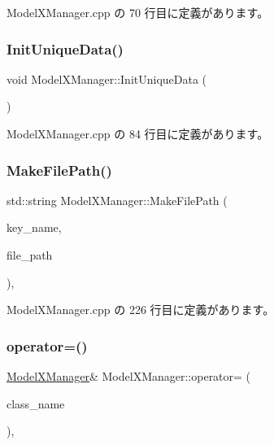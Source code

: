  Model\+X\+Manager.\+cpp の 70 行目に定義があります。

\mbox{\label{class_model_x_manager_a9bed6cb5ffcd2cbfec6c405e21af362e}} 
\subsubsection{\texorpdfstring{Init\+Unique\+Data()}{InitUniqueData()}}
{\footnotesize\ttfamily void Model\+X\+Manager\+::\+Init\+Unique\+Data (\begin{DoxyParamCaption}{ }\end{DoxyParamCaption})\hspace{0.3cm}{\ttfamily [static]}}



 Model\+X\+Manager.\+cpp の 84 行目に定義があります。

\mbox{\label{class_model_x_manager_a2d367047714442f8a928e4360d11b773}} 
\subsubsection{\texorpdfstring{Make\+File\+Path()}{MakeFilePath()}}
{\footnotesize\ttfamily std\+::string Model\+X\+Manager\+::\+Make\+File\+Path (\begin{DoxyParamCaption}\item[{const std\+::string $\ast$}]{key\+\_\+name,  }\item[{const std\+::string $\ast$}]{file\+\_\+path }\end{DoxyParamCaption})\hspace{0.3cm}{\ttfamily [static]}, {\ttfamily [private]}}



 Model\+X\+Manager.\+cpp の 226 行目に定義があります。

\mbox{\label{class_model_x_manager_adc65f6b4b9b06b4a20923245606175d8}} 
\subsubsection{\texorpdfstring{operator=()}{operator=()}}
{\footnotesize\ttfamily \mbox{\hyperlink{class_model_x_manager}{Model\+X\+Manager}}\& Model\+X\+Manager\+::operator= (\begin{DoxyParamCaption}\item[{const \mbox{\hyperlink{class_model_x_manager}{Model\+X\+Manager}} \&}]{class\+\_\+name }\end{DoxyParamCaption})\hspace{0.3cm}{\ttfamily [private]}, {\ttfamily [delete]}}

